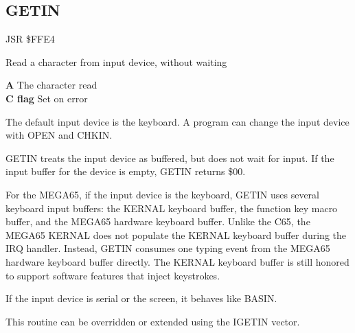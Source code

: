 \subsection{GETIN}
\label{KERNAL Jump Table!GETIN}
\begin{description}[leftmargin=2cm,style=nextline]
    \item [Address:] JSR \$FFE4
    \item [Description:] Read a character from input device, without waiting
    \item [Outputs:]
        \textbf{A} The character read \\
        \textbf{C flag} Set on error
    \item [Remarks:]
        The default input device is the keyboard. A program can change the input device with OPEN and CHKIN.

        GETIN treats the input device as buffered, but does not wait for input. If the input buffer for the device is empty, GETIN returns \$00.

        For the MEGA65, if the input device is the keyboard, GETIN uses several keyboard input buffers: the KERNAL keyboard buffer, the function key macro buffer, and the MEGA65 hardware keyboard buffer. Unlike the C65, the MEGA65 KERNAL does not populate the KERNAL keyboard buffer during the IRQ handler. Instead, GETIN consumes one typing event from the MEGA65 hardware keyboard buffer directly. The KERNAL keyboard buffer is still honored to support software features that inject keystrokes.

        If the input device is serial or the screen, it behaves like BASIN.

        This routine can be overridden or extended using the IGETIN vector.
    \item [Example:]

\end{description}



\newpage

